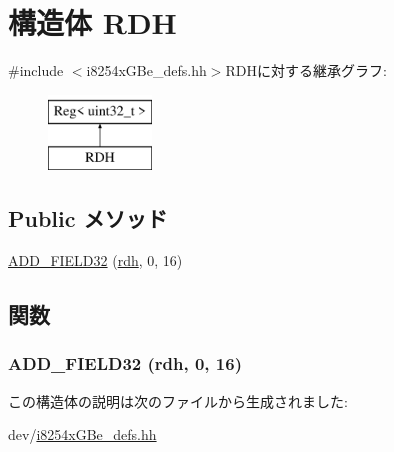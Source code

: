 \hypertarget{structiGbReg_1_1Regs_1_1RDH}{
\section{構造体 RDH}
\label{structiGbReg_1_1Regs_1_1RDH}
}


{\ttfamily \#include $<$i8254xGBe\_\-defs.hh$>$}RDHに対する継承グラフ:\begin{figure}[H]
\begin{center}
\leavevmode
\includegraphics[height=2cm]{structiGbReg_1_1Regs_1_1RDH}
\end{center}
\end{figure}
\subsection*{Public メソッド}
\begin{DoxyCompactItemize}
\item 
\hyperlink{structiGbReg_1_1Regs_1_1RDH_afef64f01cf41e6e268a82e54f421ed68}{ADD\_\-FIELD32} (\hyperlink{structiGbReg_1_1Regs_a6b6133f358acecf01c1b8f5df50bca79}{rdh}, 0, 16)
\end{DoxyCompactItemize}


\subsection{関数}
\hypertarget{structiGbReg_1_1Regs_1_1RDH_afef64f01cf41e6e268a82e54f421ed68}{
\subsubsection[{ADD\_\-FIELD32}]{\setlength{\rightskip}{0pt plus 5cm}ADD\_\-FIELD32 ({\bf rdh}, \/  0, \/  16)}}
\label{structiGbReg_1_1Regs_1_1RDH_afef64f01cf41e6e268a82e54f421ed68}


この構造体の説明は次のファイルから生成されました:\begin{DoxyCompactItemize}
\item 
dev/\hyperlink{i8254xGBe__defs_8hh}{i8254xGBe\_\-defs.hh}\end{DoxyCompactItemize}
